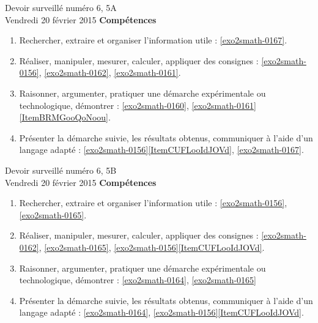 \documentclass[a4paper,10pt]{article}
\begin{document}
\begin{feuilleDS}{Devoir surveillé numéro 6, 5A\\ \small Vendredi 20 février 2015}
\vspace{1cm}
{\bf Compétences}
\begin{enumerate}
    \item
        Rechercher, extraire et organiser l'information utile : \ref{exo2smath-0167}.
    \item
        Réaliser, manipuler, mesurer, calculer, appliquer des consignes : \ref{exo2smath-0156}, \ref{exo2smath-0162},  \ref{exo2smath-0161}.
    \item
        Raisonner, argumenter, pratiquer une démarche expérimentale ou technologique, démontrer : \ref{exo2smath-0160}, \ref{exo2smath-0161}\ref{ItemBRMGooQoNoou}.
    \item 
        Présenter la démarche suivie, les résultats obtenus, communiquer à l'aide d’un langage adapté : \ref{exo2smath-0156}\ref{ItemCUFLooIdJOVd}, \ref{exo2smath-0167}.
\end{enumerate}
\end{feuilleDS}

\begin{feuilleDS}{Devoir surveillé numéro 6, 5B\\ \small Vendredi 20 février 2015}
\vspace{1cm}
{\bf Compétences}
\small
\begin{enumerate}
    \item
        Rechercher, extraire et organiser l'information utile : \ref{exo2smath-0156}, \ref{exo2smath-0165}.
    \item
        Réaliser, manipuler, mesurer, calculer, appliquer des consignes : \ref{exo2smath-0162}, \ref{exo2smath-0165}, \ref{exo2smath-0156}\ref{ItemCUFLooIdJOVd}.
    \item
        Raisonner, argumenter, pratiquer une démarche expérimentale ou technologique, démontrer : \ref{exo2smath-0164}, \ref{exo2smath-0165}
    \item 
        Présenter la démarche suivie, les résultats obtenus, communiquer à l'aide d’un langage adapté : \ref{exo2smath-0164}, \ref{exo2smath-0156}\ref{ItemCUFLooIdJOVd}.
\end{enumerate}
\end{feuilleDS}
\end{document}
